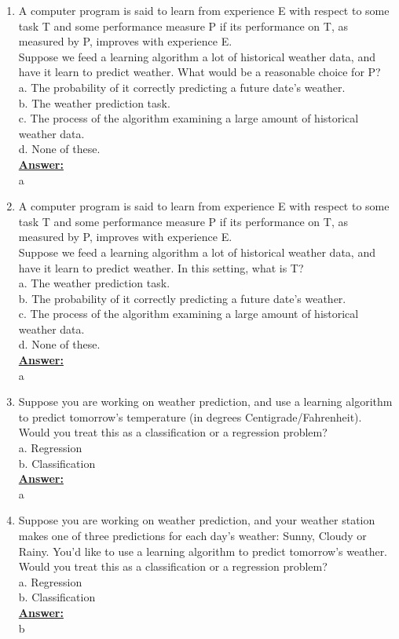 \documentclass{article}
\newenvironment{qparts}{\begin{enumerate}[1.]}{\end{enumerate}}
\begin{document}
\begin{qparts}
\item  A computer program is said to learn from experience E with respect to some task T and some performance measure P if its performance on T, as measured by P, improves with experience E.\\
 Suppose we feed a learning algorithm a lot of historical weather data, and have it learn to predict weather. What would be a reasonable choice for P? \\
a. The probability of it correctly predicting a future date’s weather.\\
b. The weather prediction task.\\
c. The process of the algorithm examining a large amount of historical weather data.\\
d. None of these.\\
\underline{\textbf{Answer:}}\\
a


 \item  A computer program is said to learn from experience E with respect to some task T and some performance measure P if its performance on T, as measured by P, improves with experience E. \\
 Suppose we feed a learning algorithm a lot of historical weather data, and have it learn to predict weather. In this setting, what is T?\\
 a. The weather prediction task.\\
b. The probability of it correctly predicting a future date’s weather.\\
c. The process of the algorithm examining a large amount of historical weather data.\\
d. None of these.\\
 
\underline{\textbf{Answer:}}\\
a

 \item  Suppose you are working on weather prediction, and use a learning algorithm to predict tomorrow’s temperature (in degrees Centigrade/Fahrenheit).\\
Would you treat this as a classification or a regression problem?\\
a. Regression\\
b. Classification\\
 
\underline{\textbf{Answer:}}\\
a

 \item  Suppose you are working on weather prediction, and your weather station makes one of three predictions for each day’s weather: Sunny, Cloudy or Rainy. You’d like to use a learning algorithm to predict tomorrow’s weather.\\
Would you treat this as a classification or a regression problem?\\
a. Regression\\
b. Classification\\
 
\underline{\textbf{Answer:}}\\
b

\end{qparts}
\end{document}
